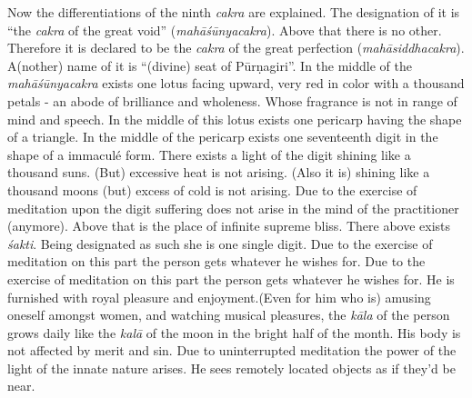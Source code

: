 \documentclass[11pt,showtrims]{memoir}
\begin{document}
Now the differentiations of the ninth \textit{cakra} are explained. The designation of it is ``the \textit{cakra} of the great void'' (\textit{mahāśūnyacakra}). Above that there is no other. Therefore it is declared to be the \textit{cakra} of the great perfection (\textit{mahāsiddhacakra}). A(nother) name of it is ``(divine) seat of Pūrṇagiri''. In the middle of the \textit{mahāśūnyacakra} exists one lotus facing upward, very red in color with a thousand petals - an abode of brilliance and wholeness. Whose fragrance is not in range of mind and speech. In the middle of this lotus exists one pericarp having the shape of a triangle. In the middle of the pericarp exists one seventeenth digit in the shape of a immaculé form. There exists a light of the digit shining like a thousand suns. (But) excessive heat is not arising. (Also it is) shining like a thousand moons (but) excess of cold is not arising. Due to the exercise of meditation upon the digit suffering does not arise in the mind of the practitioner (anymore). Above that is the place of infinite supreme bliss. There above exists \textit{śakti}. Being designated as such she is one single digit. Due to the exercise of meditation on this part the person gets whatever he wishes for. Due to the exercise of meditation on this part the person gets whatever he wishes for. He is furnished with royal pleasure and enjoyment.(Even for him who is) amusing oneself amongst women, and watching musical pleasures, the \textit{kāla} of the person grows daily like the \textit{kalā} of the moon in the bright half of the month. His body is not affected by merit and sin. Due to uninterrupted meditation the power of the light of the innate nature arises. He sees remotely located objects as if they'd be near. 







 







\endnumbering
\end{document}
